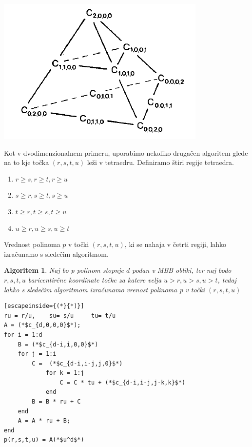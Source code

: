 \documentclass{article}
\newtheorem{algoritm}{Algoritem}[section]
\begin{document}
\begin{center}
\includegraphics[width=.7\linewidth]{tetraeder.PNG}
\end{center}

Kot v dvodimenzionalnem primeru, uporabimo nekoliko drugačen algoritem glede na to kje točka $(r, s, t, u)$ leži v tetraedru.
Definiramo štiri regije tetraedra.

\begin{enumerate}
\item $r\geq s, r\geq t, r\geq u$
\item $s\geq r, s\geq t, s\geq u$
\item $t\geq r, t\geq s, t\geq u$
\item $u\geq r,u\geq s, u\geq t$
\end{enumerate}


Vrednost polinoma $p$ v točki $(r,s,t,u)$, ki se nahaja v četrti regiji, lahko izračunamo s sledečim algoritmom.

\begin{algoritm}
Naj bo p polinom stopnje $d$ podan v MBB obliki, ter naj bodo $ r,s,t,u$ baricentirčne koordinate točke za katere velja $u > r,u > s, u>t$, tedaj lahko s sledečim algoritmom izračunamo vrenost polinoma p v točki $(r,s,t,u)$

\begin{lstlisting}[escapeinside={(*}{*)}]
ru = r/u,	 su= s/u	 tu= t/u
A = (*$c_{d,0,0,0}$*);
for i = 1:d
    B = (*$c_{d-i,i,0,0}$*)
    for j = 1:i
        C =  (*$c_{d-i,i-j,j,0}$*)
            for k = 1:j
                C = C * tu + (*$c_{d-i,i-j,j-k,k}$*)
            end
        B = B * ru + C
    end
    A = A * ru + B;
end
p(r,s,t,u) = A(*$u^d$*)
\end{lstlisting}
\end{algoritm}
\end{document}
